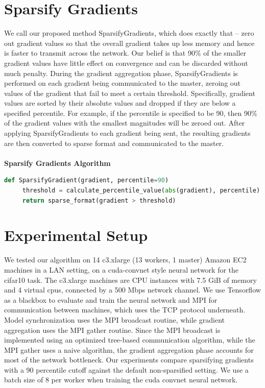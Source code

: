 \documentclass[10pt]{article}
\begin{document}
\section{Sparsify Gradients}
\label{sec-3}

We call our proposed method SparsifyGradients, which does exactly that
-- zero out gradient values so that the overall gradient takes up less
memory and hence is faster to transmit across the network. Our belief
is that 90\% of the smaller gradient
values have little effect on convergence and can be discarded without
much penalty. During the gradient aggregation phase, SparsifyGradients
is performed on each gradient being communicated to the master,
zeroing out values of the gradient that fail to meet a certain threshold.
Specifically, gradient values are sorted by their absolute values and
dropped if they are below a specified percentile. For example, if
the percentile is specified to be 90, then 90\% of the gradient values with the smallest magnitudes
will be zeroed out. After applying SparsifyGradients
to each gradient being sent, the resulting gradients are then
converted to sparse format and communicated to the master.
\\
\\
\textbf{Sparsify Gradients Algorithm}
\begin{lstlisting}[language=Python,frame=lines]
def SparsifyGradient(gradient, percentile=90)
     threshold = calculate_percentile_value(abs(gradient), percentile)
     return sparse_format(gradient > threshold)
\end{lstlisting}

\section{Experimental Setup}
\label{sec-4}
We tested our algorithm on 14 c3.xlarge (13 workers, 1 master) Amazon
EC2 machines in a LAN setting, on a cuda-convnet style neural network
for the cifar10 task. The c3.xlarge machines are CPU instances with
7.5 GiB of memory and 4 virtual cpus, connected by a 500 Mbps network
channel. We use Tensorflow as a blackbox to evaluate and train the
neural network and MPI for communication between machines, which uses
the TCP protocol underneath. Model synchronization uses the MPI
broadcast routine, while gradient aggregation uses the MPI gather
routine. Since the MPI broadcast is implemented using an optimized
tree-based communication algorithm, while the MPI gather uses a naive
algorithm, the gradient aggregation phase accounts for most of the
network bottleneck. Our experiments compare sparsifying gradients with
a 90 percentile cutoff against the default non-sparsified setting. We
use a batch size of 8 per worker when training the cuda convnet neural
network.
\end{document}
